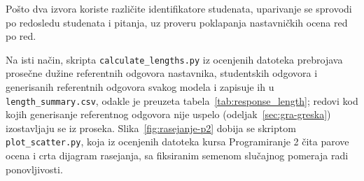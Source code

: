 Pošto dva izvora koriste različite identifikatore studenata,
uparivanje se sprovodi po redosledu studenata i pitanja,
uz proveru poklapanja nastavničkih ocena red po red.

Na isti način, skripta \texttt{calculate\_lengths.py} iz ocenjenih datoteka prebrojava prosečne dužine
referentnih odgovora nastavnika, studentskih odgovora i generisanih referentnih odgovora svakog modela
i zapisuje ih u \texttt{length\_summary.csv}, odakle je preuzeta tabela~\ref{tab:response_length};
redovi kod kojih generisanje referentnog odgovora nije uspelo (odeljak~\ref{sec:gra-greska}) izostavljaju se iz proseka.
Slika~\ref{fig:rasejanje-p2} dobija se skriptom \texttt{plot\_scatter.py},
koja iz ocenjenih datoteka kursa Programiranje 2 čita parove ocena
i crta dijagram rasejanja, sa fiksiranim semenom slučajnog pomeraja radi ponovljivosti.
